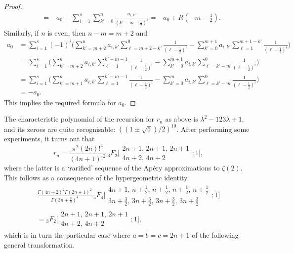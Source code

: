 \documentclass[12pt,reqno]{amsart}
\begin{document}
\begin{proof}
\begin{align*}
&=-a_0+\sum_{i=1}^s\sum_{k'=0}^n\frac{a_{i,k'}}{(k'-m-\frac12)^i}
=-a_0+R(-m-\tfrac12).
\end{align*}
Similarly, if $n$ is even, then $n-m=m+2$ and
\begin{align*}
a_0
&=\sum_{i=1}^s(-1)^i\biggl(\sum_{k'=m+2}^na_{i,k'}\sum_{\ell=m+2-k'}^0\frac1{(\ell-\frac12)^i}
-\sum_{k'=0}^{m+1}a_{i,k'}\sum_{\ell=1}^{m+1-k'}\frac1{(\ell-\frac12)^i}\biggr)
\\
&=\sum_{i=1}^s\biggl(\sum_{k'=m+2}^na_{i,k'}\sum_{\ell=1}^{k'-m-1}\frac1{(\ell-\frac12)^i}
-\sum_{k'=0}^{m+1}a_{i,k'}\sum_{\ell=k'-m}^0\frac1{(\ell-\frac12)^i}\biggr)
\\
&=\sum_{i=1}^s\biggl(\sum_{k'=m+1}^na_{i,k'}\sum_{\ell=1}^{k'-m-1}\frac1{(\ell-\frac12)^i}
-\sum_{k'=0}^ma_{i,k'}\sum_{\ell=k'-m}^0\frac1{(\ell-\frac12)^i}\biggr)
\\
&=-a_0.
\end{align*}
This implies the required formula for $a_0$.
\end{proof}

The characteristic polynomial of the recursion for $r_n$ as above is $\lambda^2-123\lambda+1$, and its zeroes are
quite recognisable: $((1\pm\sqrt5)/2)^{10}$. After performing some
experiments, it turns out that
$$
r_n
=\frac{\pi^2(2n)!^4}{(4n+1)!^2}
\,{}_3F_2\biggl[\begin{matrix} 2n+1, \, 2n+1, \, 2n+1 \\ 4n+2, \, 4n+2 \end{matrix}; 1\biggr],
$$
where the latter is a `rarified' sequence of the Ap\'ery approximations to $\zeta(2)$. This follows as a consequence
of the hypergeometric identity
\begin{multline} \label{eq:2n+1/4n+2}
\frac{\Gamma(4n+2)^2\Gamma(2n+1)^2}{\Gamma(3n+\frac32)^4}
\,{}_5F_4\biggl[\begin{matrix} 4n+1, \, n+\frac12, \, n+\frac12, \, n+\frac12, \, n+\frac12 \\[2pt]
3n+\frac32, \, 3n+\frac32, \, 3n+\frac32, \, 3n+\frac32 \end{matrix};1\biggr]
\\
={}_3F_2\biggl[\begin{matrix} 2n+1, \, 2n+1, \, 2n+1 \\ 4n+2, \, 4n+2 \end{matrix};1\biggr],
\end{multline}
which is in turn the particular case where $a=b=c=2n+1$ of the following general transformation.
\end{document}

